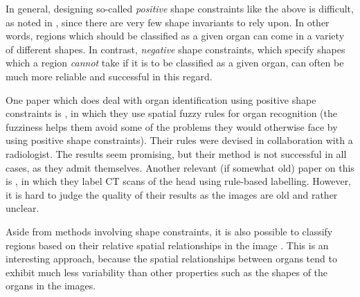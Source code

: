 In general, designing so-called \emph{positive} shape constraints like the above is difficult, as noted in \cite{kobashi95}, since there are very few shape invariants to rely upon. In other words, regions which should be classified as a given organ can come in a variety of different shapes. In contrast, \emph{negative} shape constraints, which specify shapes which a region \emph{cannot} take if it is to be classified as a given organ, can often be much more reliable and successful in this regard.

One paper which does deal with organ identification using positive shape constraints is \cite{lee03}, in which they use spatial fuzzy rules for organ recognition (the fuzziness helps them avoid some of the problems they would otherwise face by using positive shape constraints). Their rules were devised in collaboration with a radiologist. The results seem promising, but their method is not successful in all cases, as they admit themselves. Another relevant (if somewhat old) paper on this is \cite{cosic97}, in which they label CT scans of the head using rule-based labelling. However, it is hard to judge the quality of their results as the images are old and rather unclear.

Aside from methods involving shape constraints, it is also possible to classify regions based on their relative spatial relationships in the image \cite{atif07}. This is an interesting approach, because the spatial relationships between organs tend to exhibit much less variability than other properties such as the shapes of the organs in the images.